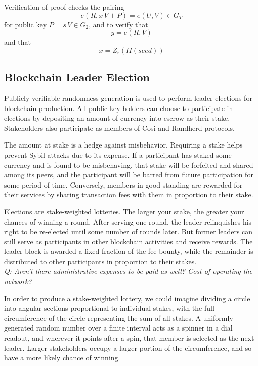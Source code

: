 \documentclass{yellowpaper}
\begin{document}
Verification of proof checks the pairing $$e(R, x \, V + P) = e(U,V)  \in G_T$$ for public key $P = s \, V \in G_2$, and to verify that $$y = e(R,V)$$ and that $$x = Z_r(H(seed))$$
\subsection{Blockchain Leader Election}
Publicly verifiable randomness generation is used to perform leader elections for blockchain production. All public key holders can choose to participate in elections by depositing an amount of currency into escrow as their stake. Stakeholders also participate as members of Cosi and Randherd protocols.

The amount at stake is a hedge against misbehavior.  Requiring a stake helps prevent Sybil attacks due to its expense. If a participant has staked some currency and is found to be misbehaving, that stake will be forfeited and shared among its peers, and the participant will be barred from future participation for some period of time. Conversely, members in good standing are rewarded for their services by sharing transaction fees with them in proportion to their stake.

Elections are stake-weighted lotteries. The larger your stake, the greater your chances of winning a round. After serving one round, the leader relinquishes his right to be re-elected until some number of rounds later. But former leaders can still serve as participants in other blockchain activities and receive rewards. The leader block is awarded a fixed fraction of the fee bounty, while the remainder is distributed to other participants in proportion to their stakes.
$$
$$
{\em{Q: Aren't there administrative expenses to be paid as well? Cost of operating the network?}}
$$
$$

In order to produce a stake-weighted lottery, we could imagine dividing a circle into angular sections proportional to individual stakes, with the full circumference of the circle representing the sum of all stakes. A uniformly generated random number over a finite interval acts as a spinner in a dial readout, and wherever it points after a spin, that member is selected as the next leader. Larger stakeholders occupy a larger portion of the circumference, and so have a more likely chance of winning.
\end{document}
